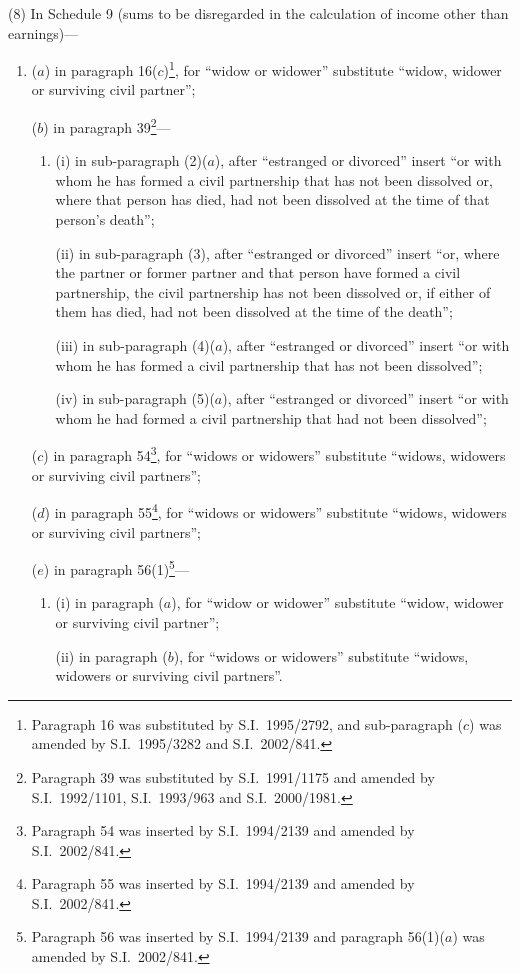 \documentclass[12pt,a4paper]{article}
\begin{document}
(8) In Schedule 9 (sums to be disregarded in the calculation of income other than earnings)—
\begin{enumerate}\item[]
($a$) in paragraph 16($c$)\footnote{Paragraph 16 was substituted by S.I.\ 1995/2792, and sub-paragraph ($c$) was amended by S.I.\ 1995/3282 and S.I.\ 2002/841.}, for “widow or widower” substitute “widow, widower or surviving civil partner”;

($b$) in paragraph 39\footnote{Paragraph 39 was substituted by S.I.\ 1991/1175 and amended by S.I.\ 1992/1101, S.I.\ 1993/963 and S.I.\ 2000/1981.}—
\begin{enumerate}\item[]
(i) in sub-paragraph (2)($a$), after “estranged or divorced” insert “or with whom he has formed a civil partnership that has not been dissolved or, where that person has died, had not been dissolved at the time of that person’s death”;

(ii) in sub-paragraph (3), after “estranged or divorced” insert “or, where the partner or former partner and that person have formed a civil partnership, the civil partnership has not been dissolved or, if either of them has died, had not been dissolved at the time of the death”;

(iii) in sub-paragraph (4)($a$), after “estranged or divorced” insert “or with whom he has formed a civil partnership that has not been dissolved”;

(iv) in sub-paragraph (5)($a$), after “estranged or divorced” insert “or with whom he had formed a civil partnership that had not been dissolved”;
\end{enumerate}

($c$) in paragraph 54\footnote{Paragraph 54 was inserted by S.I.\ 1994/2139 and amended by S.I.\ 2002/841.}, for “widows or widowers” substitute “widows, widowers or surviving civil partners”;

($d$) in paragraph 55\footnote{Paragraph 55 was inserted by S.I.\ 1994/2139 and amended by S.I.\ 2002/841.}, for “widows or widowers” substitute “widows, widowers or surviving civil partners”;

($e$) in paragraph 56(1)\footnote{Paragraph 56 was inserted by S.I.\ 1994/2139 and paragraph 56(1)($a$) was amended by S.I.\ 2002/841.}—
\begin{enumerate}\item[]
(i) in paragraph ($a$), for “widow or widower” substitute “widow, widower or surviving civil partner”;

(ii) in paragraph ($b$), for “widows or widowers” substitute “widows, widowers or surviving civil partners”.
\end{enumerate}
\end{enumerate}
\end{document}
